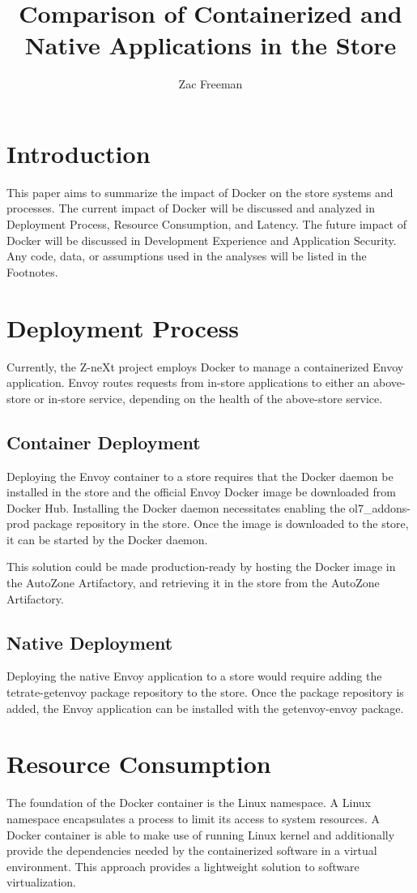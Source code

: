 \documentclass{article}
\title{Comparison of Containerized and Native Applications in the Store}
\author{Zac Freeman}
\begin{document}
\maketitle

\section{Introduction}
This paper aims to summarize the impact of Docker on the store systems and processes. The current impact of Docker will be discussed and analyzed in Deployment Process, Resource Consumption, and Latency. The future impact of Docker will be discussed in Development Experience and Application Security. Any code, data, or assumptions used in the analyses will be listed in the Footnotes.

\section{Deployment Process}
Currently, the Z-neXt project employs Docker to manage a containerized Envoy application. Envoy routes requests from in-store applications to either an above-store or in-store service, depending on the health of the above-store service.

\subsection{Container Deployment}
Deploying the Envoy container to a store requires that the Docker daemon be installed in the store and the official Envoy Docker image be downloaded from Docker Hub. Installing the Docker daemon necessitates enabling the ol7\_addons-prod package repository in the store. Once the image is downloaded to the store, it can be started by the Docker daemon.

This solution could be made production-ready by hosting the Docker image in the AutoZone Artifactory, and retrieving it in the store from the AutoZone Artifactory.

\subsection{Native Deployment}
Deploying the native Envoy application to a store would require adding the tetrate-getenvoy package repository to the store. Once the package repository is added, the Envoy application can be installed with the getenvoy-envoy package.

\section{Resource Consumption}
The foundation of the Docker container is the Linux namespace. A Linux namespace encapsulates a process to limit its access to system resources. A Docker container is able to make use of running Linux kernel and additionally provide the dependencies needed by the containerized software in a virtual environment. This approach provides a lightweight solution to software virtualization.
\end{document}
